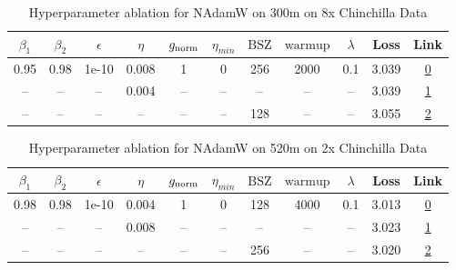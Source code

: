 \begin{table}[H]
\centering
\caption{Hyperparameter ablation for NAdamW on 300m on 8x Chinchilla Data}
\label{tab:ablation_nadamw_300m_on_8x_chinchilla_data}
\begin{tabular}{ccccccccccc}
\toprule
$\beta_1$ & $\beta_2$ & $\epsilon$ & $\eta$ & $g_{\mathrm{norm}}$ & $\eta_{min}$ & $\mathrm{BSZ}$ & $\mathrm{warmup}$ & $\lambda$ & Loss & Link \\
\midrule
0.95 & 0.98 & 1e-10 & 0.008 & 1 & 0 & 256 & 2000 & 0.1 & 3.039 & \href{https://wandb.ai/marin-community/optimizer-scaling/runs/sweep-300m-48B-nadamw506173lr0.008-wd0.1-minlr0-warmup2000-b10.9-a344a3}{0} \\
\midrule
-- & -- & -- & 0.004 & -- & -- & -- & -- & -- & 3.039 & \href{https://wandb.ai/marin-community/optimizer-scaling/runs/sweep-300m-48B-nadamw511d7blr0.004-wd0.1-minlr0-warmup2000-b10.9-9099f5}{1} \\
-- & -- & -- & -- & -- & -- & 128 & -- & -- & 3.055 & \href{https://wandb.ai/marin-community/optimizer-scaling/runs/sweep-300m-48B-nadamwfd0717lr0.008-wd0.1-minlr0-warmup2000-b10.9-5665cf}{2} \\
\bottomrule
\end{tabular}
\end{table}

\begin{table}[H]
\centering
\caption{Hyperparameter ablation for NAdamW on 520m on 2x Chinchilla Data}
\label{tab:ablation_nadamw_520m_on_2x_chinchilla_data}
\begin{tabular}{ccccccccccc}
\toprule
$\beta_1$ & $\beta_2$ & $\epsilon$ & $\eta$ & $g_{\mathrm{norm}}$ & $\eta_{min}$ & $\mathrm{BSZ}$ & $\mathrm{warmup}$ & $\lambda$ & Loss & Link \\
\midrule
0.98 & 0.98 & 1e-10 & 0.004 & 1 & 0 & 128 & 4000 & 0.1 & 3.013 & \href{https://wandb.ai/marin-community/optimizer-scaling/runs/sweep-520m-21B-nadamw0a1fe6lr0.004-wd0.1-minlr0-warmup4000-b10.9-2d3f42}{0} \\
\midrule
-- & -- & -- & 0.008 & -- & -- & -- & -- & -- & 3.023 & \href{https://wandb.ai/marin-community/optimizer-scaling/runs/sweep-520m-21B-nadamw999646lr0.008-wd0.1-minlr0-warmup4000-b10.9-e42d78}{1} \\
-- & -- & -- & -- & -- & -- & 256 & -- & -- & 3.020 & \href{https://wandb.ai/marin-community/optimizer-scaling/runs/sweep-520m-21B-nadamw98f1d8lr0.004-wd0.1-minlr0-warmup4000-b10.9-727fdb}{2} \\
\bottomrule
\end{tabular}
\end{table}

